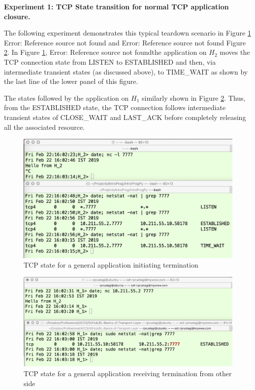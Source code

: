 \begin{multicols}{2}
\medskip
\noindent
\textbf{Experiment 1: TCP State transition for normal TCP application closure.}
\smallskip

The following experiment demonstrates this typical teardown scenario in Figure \ref{chap3-fig3} Error: Reference source not found and Error: Reference source not found Figure \ref{chap3-fig4}. In Figure \ref{chap3-fig3}, Error: Reference source not foundthe application on $H_{2}$ moves the TCP connection state from LISTEN to ESTABLISHED and then, via intermediate transient states (as discussed above), to TIME\_WAIT as shown by the last line of the lower panel of this figure.

The states followed by the application on $H_{1}$ similarly shown in Figure \ref{chap3-fig4}. Thus, from the ESTABLISHED state, the TCP connection follows intermediate transient states of CLOSE\_WAIT and LAST\_ACK before completely releasing all the associated resource.
\end{multicols}

\begin{figure}[!htb]
\centering
\includegraphics[scale=.25]{src/Figures/chap3/3.jpg}
\caption{TCP state for a general application initiating termination}\label{chap3-fig3}
\end{figure}

\begin{figure}[!htb]
\centering
\includegraphics[scale=.45]{src/Figures/chap3/4.jpg}
\caption{TCP state for a general application receiving termination from other side}\label{chap3-fig4}
\end{figure}

